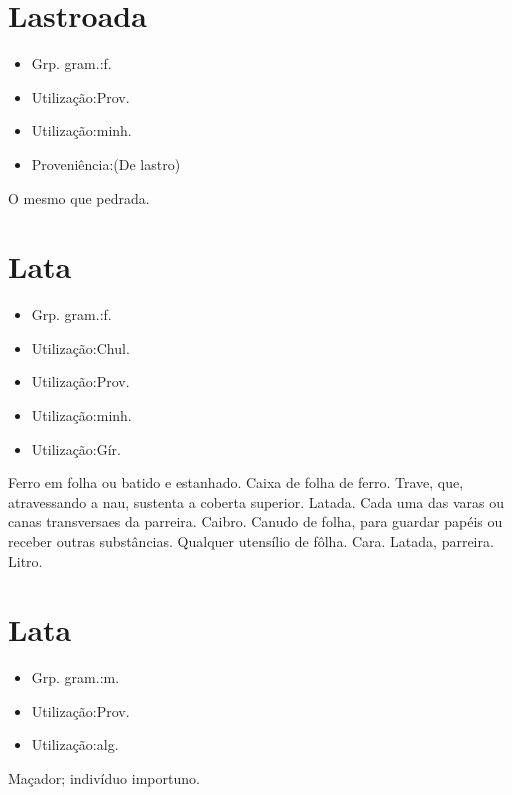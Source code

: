\section{Lastroada}
\begin{itemize}
\item {Grp. gram.:f.}
\end{itemize}
\begin{itemize}
\item {Utilização:Prov.}
\end{itemize}
\begin{itemize}
\item {Utilização:minh.}
\end{itemize}
\begin{itemize}
\item {Proveniência:(De \textunderscore lastro\textunderscore )}
\end{itemize}
O mesmo que \textunderscore pedrada\textunderscore .
\section{Lata}
\begin{itemize}
\item {Grp. gram.:f.}
\end{itemize}
\begin{itemize}
\item {Utilização:Chul.}
\end{itemize}
\begin{itemize}
\item {Utilização:Prov.}
\end{itemize}
\begin{itemize}
\item {Utilização:minh.}
\end{itemize}
\begin{itemize}
\item {Utilização:Gír.}
\end{itemize}
Ferro em folha ou batido e estanhado.
Caixa de folha de ferro.
Trave, que, atravessando a nau, sustenta a coberta superior.
Latada.
Cada uma das varas ou canas transversaes da parreira.
Caibro.
Canudo de folha, para guardar papéis ou receber outras substâncias.
Qualquer utensílio de fôlha.
Cara.
Latada, parreira.
Litro.
\section{Lata}
\begin{itemize}
\item {Grp. gram.:m.}
\end{itemize}
\begin{itemize}
\item {Utilização:Prov.}
\end{itemize}
\begin{itemize}
\item {Utilização:alg.}
\end{itemize}
Maçador; indivíduo importuno.
